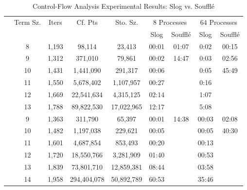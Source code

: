  \begin{table*}
 \centering
\caption{Control-Flow Analysis Experimental Results: Slog vs. Souffl\'e}\label{tab:results-aam}
 \begin{tabular}{ccccccccc}
   \toprule 
 & \multirow{2}{*}{Term Sz.}&\multirow{2}{*}{Iters}& \multirow{2}{*}{Cf. Pts}& \multirow{2}{*}{Sto. Sz.}& \multicolumn{2}{c}{$8$ Processes} & \multicolumn{2}{c}{$64$ Processes} \\
 & & & & & \multicolumn{1}{c|}{Slog} & \multicolumn{1}{c||}{Souffl\'e}& \multicolumn{1}{c|}{Slog}& \multicolumn{1}{c}{Souffl\'e}\\
 \midrule 
 \parbox[t]{2mm}{}
 & 8 & 1,193 & 98,114 & 23,413 & 00:01 & 01:07 & 0:02 & 00:15\\
 & 9 & 1,312 & 371,010 & 79,861 & 00:02 & 14:47 & 0:03 & 02:56 \\
 & 10 & 1,431 & 1,441,090 & 291,317 & 00:06 & \timeout{} & 0:05 & 45:49 \\
 & 11 & 1,550 & 5,678,402 &  1,107,957 & 00:27 & \timeout{} & 0:16 & \timeout{} \\
 & 12 & 1,669 & 22,541,634 & 4,315,125 & 02:14 & \timeout{} & 1:07 & \timeout{} \\
 & 13 & 1,788 & 89,822,530 & 17,022,965 & 12:17 & \timeout{} & 5:08 & \timeout{} \\
\midrule 
 \parbox[t]{2mm}{}
 & 9 & 1,363 & 311,790 & 65,397 & 00:01 & 14:38 & 00:03 & 02:08 \\
 & 10 & 1,482 & 1,197,038 & 229,621 & 00:05 & \timeout{} & 00:05 & 40:30 \\
 & 11 & 1,601 & 4,687,854 & 853,493 & 00:20 & \timeout{} & 00:13 & \timeout{} \\
 & 12 & 1,720 & 18,550,766 & 3,281,909 & 01:40 & \timeout{} & 00:53 & \timeout{} \\
 & 13 & 1,839 & 73,801,710 & 12,859,381 & 08:44 & \timeout{} & 03:58 & \timeout{} \\
 & 14 & 1,958 & 294,404,078 & 50,892,789 & 60:53 & \timeout{} & 35:46 & \timeout{} \\


\end{tabular}
\end{table*}
